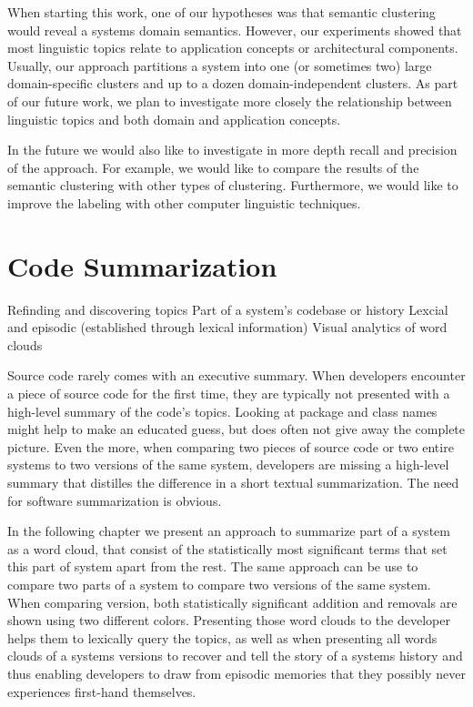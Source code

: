 When starting this work, one of our hypotheses was that semantic clustering would reveal a systems domain semantics. However, our experiments showed that most linguistic topics relate to application concepts or architectural components. Usually, our approach partitions a system into one (or sometimes two) large domain-specific clusters and up to a dozen domain-independent clusters. As part of our future work, we plan to investigate more closely the relationship between linguistic topics and both domain and application concepts.

In the future we would also like to investigate in more depth recall and precision of the approach. For example, we would like to compare the results of the semantic clustering with other types of clustering. Furthermore, we would like to improve the labeling with other computer linguistic techniques.


\chapter{Code Summarization}
\label{the chapter on LogLR}

\infobox
	{Refinding and discovering topics}
	{Part of a system's codebase or history}
	{Lexcial and episodic (established through lexical information)}
	{Visual analytics of word clouds}

Source code rarely comes with an executive summary. When developers encounter a piece of source code for the first time, they are typically not presented with a high-level summary of the code's topics. Looking at package and class names might help to make an educated guess, but does often not give away the complete picture. Even the more, when comparing two pieces of source code or two entire systems to two versions of the same system, developers are missing a high-level summary that distilles the difference in a short textual summarization. The need for software summarization is obvious.

In the following chapter we present an approach to summarize part of a system as a word cloud, that consist of the statistically most significant terms that set this part of system apart from the rest. The same approach can be use to compare two parts of a system to compare two versions of the same system. When comparing version, both statistically significant addition and removals are shown using two different colors. Presenting those word clouds to the developer helps them to lexically query the topics, as well as when presenting all words clouds of a systems versions to recover and tell the story of a systems history and thus enabling developers to draw from episodic memories that they possibly never experiences first-hand themselves.

